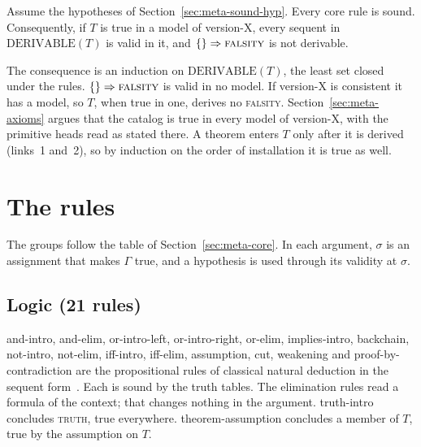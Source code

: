 \begin{prop}\label{prop:meta-sound}
Assume the hypotheses of Section~\ref{sec:meta-sound-hyp}.  Every core
rule is sound.  Consequently, if $T$ is true in a model of version-X,
every sequent in $\mathrm{DERIVABLE}(T)$ is valid in it, and
$\{\}\Rightarrow\textsc{falsity}$ is not derivable.
\end{prop}

The consequence is an induction on $\mathrm{DERIVABLE}(T)$, the least
set closed under the rules.  $\{\}\Rightarrow\textsc{falsity}$ is valid in no
model.  If version-X is consistent it has a model, so $T$, when true in
one, derives no \textsc{falsity}.  Section~\ref{sec:meta-axioms} argues
that the catalog is true in every model of version-X, with the primitive
heads read as stated there.  A theorem enters $T$ only after it is derived
(links~1 and~2), so by induction on the order of installation it is true
as well.

\section{The rules}\label{sec:meta-rules}

The groups follow the table of Section~\ref{sec:meta-core}.  In each
argument, $\sigma$ is an assignment that makes $\Gamma$ true, and a
hypothesis is used through its validity at $\sigma$.

\subsection{Logic (21 rules)}

and-intro, and-elim, or-intro-left, or-intro-right, or-elim,
implies-intro, backchain, not-intro, not-elim, iff-intro, iff-elim,
assumption, cut, weakening and proof-by-contradiction are the
propositional rules of classical natural deduction in the sequent
form~\cite{Gentzen1935}.  Each is sound by the truth tables.  The
elimination rules read a formula of the context; that changes nothing in
the argument.  truth-intro concludes \textsc{truth},
true everywhere.  theorem-assumption concludes a member of $T$, true by
the assumption on $T$.

